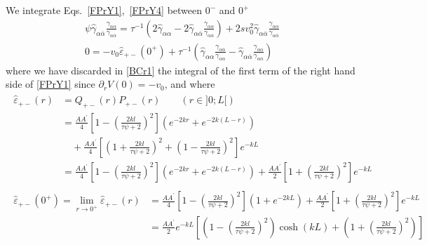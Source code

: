 \documentclass[pre,aps,superscriptaddress,nofootinbib]{revtex4}
\begin{document}
We integrate Eqs.~\ref{FPrY1},~\ref{FPrY4} between $0^-$ and $0^+$
\begin{eqnarray}
\label{BCr1}
\psi \hat{\gamma}_{\alpha\overline{\alpha}} \frac{\gamma_{\alpha\alpha}}{\gamma_{\alpha\overline{\alpha}}} = \tau^{-1} \left(2 \hat{\gamma}_{\alpha\alpha} - 2 \hat{\gamma}_{\alpha\overline{\alpha}} \frac{\gamma_{\alpha\alpha}}{\gamma_{\alpha\overline{\alpha}}}\right) + 2 s v_0^2 \hat{\gamma}_{\alpha\overline{\alpha}} \frac{\gamma_{\alpha\alpha}}{\gamma_{\alpha\overline{\alpha}}}\\
\label{BCr2}
0 = - v_0 \hat{\varepsilon}_{+-}(0^+) + \tau^{-1} \left(\hat{\gamma}_{\alpha\alpha} \frac{\gamma_{\alpha\overline{\alpha}}}{\gamma_{\alpha\alpha}} - \hat{\gamma}_{\alpha\overline{\alpha}} \frac{\gamma_{\alpha\alpha}}{\gamma_{\alpha\overline{\alpha}}}\right)
\end{eqnarray}
where we have discarded in \eqref{BCr1} the integral of the first term of the right hand side of \eqref{FPrY1} since $\partial_r V(0) = -v_0$, and where
\begin{eqnarray}
\label{he+-}
\begin{aligned}
\hat{\varepsilon}_{+-}(r) &= Q_{+-}(r) P_{+-}(r) \qquad (r \in ]0; L[)\\
&= \frac{A A^{\prime}}{4} \left[1 - \left(\frac{2 k l}{\tau \psi + 2}\right)^2\right](e^{-2 k r} + e^{-2 k (L - r)})\\
&\quad+ \frac{A A^{\prime}}{4} \left[\left(1 + \frac{2 k l}{\tau \psi + 2}\right)^2 + \left(1 - \frac{2 k l}{\tau \psi + 2}\right)^2\right] e^{-k L}\\
&= \frac{A A^{\prime}}{4} \left[1 - \left(\frac{2 k l}{\tau \psi + 2}\right)^2\right](e^{-2 k r} + e^{-2 k (L - r)}) + \frac{A A^{\prime}}{2} \left[1 + \left(\frac{2 k l}{\tau \psi + 2}\right)^2\right] e^{-k L}
\end{aligned}\\
\label{he+-lim}
\begin{aligned}
\hat{\varepsilon}_{+-}(0^+) = \lim_{r \to 0^+} \hat{\varepsilon}_{+-}(r) &= \frac{A A^{\prime}}{4} \left[1 - \left(\frac{2 k l}{\tau \psi + 2}\right)^2\right](1 + e^{-2 k L}) + \frac{A A^{\prime}}{2} \left[1 + \left(\frac{2 k l}{\tau \psi + 2}\right)^2\right] e^{-k L}\\
&= \frac{A A^{\prime}}{2} e^{-k L}\left[\left(1 - \left(\frac{2 k l}{\tau\psi + 2}\right)^2\right) \cosh(k L) + \left(1 + \left(\frac{2 k l}{\tau\psi + 2}\right)^2\right)\right]
\end{aligned}
\end{eqnarray}
\end{document}
